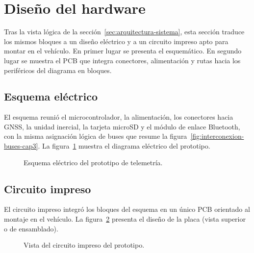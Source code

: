 \section{Diseño del hardware}
\label{sec:diseno-hardware}

Tras la vista lógica de la sección~\ref{sec:arquitectura-sistema}, esta sección traduce los mismos bloques a un diseño eléctrico y a un circuito impreso apto para montar en el vehículo. En primer lugar se presenta el esquemático. En segundo lugar se muestra el PCB que integra conectores, alimentación y rutas hacia los periféricos del diagrama en bloques.

\subsection{Esquema eléctrico}

El esquema reunió el microcontrolador, la alimentación, los conectores hacia GNSS, la unidad inercial, la tarjeta microSD y el módulo de enlace Bluetooth, con la misma asignación lógica de buses que resume la figura~\ref{fig:interconexion-buses-cap3}. La figura~\ref{fig:cap3-esquema-electrico} muestra el diagrama eléctrico del prototipo.

\begin{figure}[H]
	\centering
	\caption[Esquema eléctrico]{Esquema eléctrico del prototipo de telemetría.}
	\label{fig:cap3-esquema-electrico}
\end{figure}

\subsection{Circuito impreso}

El circuito impreso integró los bloques del esquema en un único PCB orientado al montaje en el vehículo. La figura~\ref{fig:cap3-pcb} presenta el diseño de la placa (vista superior o de ensamblado).

\begin{figure}[H]
	\centering
	\caption[Circuito impreso]{Vista del circuito impreso del prototipo.}
	\label{fig:cap3-pcb}
\end{figure}

